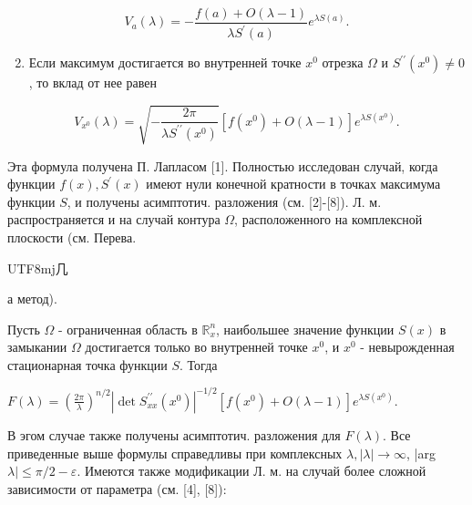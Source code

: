 \documentclass[10pt]{article}
\begin{document}
\[

V_{a}(\lambda)=-\frac{f(a)+O(\lambda-1)}{\lambda S^{\prime}(a)} e^{\lambda S(a)} .

\]



\begin{enumerate}

  \setcounter{enumi}{1}

  \item Если максимум достигается во внутренней точке $x^{0}$ отрезка $\Omega$ и $S^{\prime \prime}\left(x^{0}\right) \neq 0$, то вклад от нее равен

\end{enumerate}



\[

V_{x^{0}}(\lambda)=\sqrt{-\frac{2 \pi}{\lambda S^{\prime \prime}\left(x^{0}\right)}}\left[f\left(x^{0}\right)+O(\lambda-1)\right] e^{\lambda S\left(x^{0}\right)} .

\]



Эта формула получена П. Лапласом [1]. Полностью исследован случай, когда функции $f(x), S^{\prime}(x)$ имеют нули конечной кратности в точках максимума функции $S$, и получены асимптотич. разложения (см. [2]-[8]). Л. м. распространяется и на случай контура $\Omega$, расположенного на комплексной плоскости (см. Перева.\begin{CJK}{UTF8}{mj}几\end{CJK}а метод).



Пусть $\Omega$ - ограниченная область в $\mathbb{R}_{x}^{n}$, наибольшее значение функции $S(x)$ в замыкании $\Omega$ достигается только во внутренней точке $x^{0}$, и $x^{0}$ - невырожденная стационарная точка функции $S$. Тогда



$F(\lambda)=\left(\frac{2 \pi}{\lambda}\right)^{n / 2}\left|\operatorname{det} S_{x x}^{\prime \prime}\left(x^{0}\right)\right|^{-1 / 2}\left[f\left(x^{0}\right)+O(\lambda-1)\right] e^{\lambda S\left(x^{0}\right)}$.



В эгом случае также получены асимптотич. разложения для $F(\lambda)$. Все приведенные выше формулы справедливы при комплексных $\lambda,|\lambda| \rightarrow \infty$, |arg $\lambda \mid \leqslant \pi / 2-\varepsilon$. Имеются также модификации Л. м. на случай более сложной зависимости от параметра (см. [4], [8]):
\end{document}
